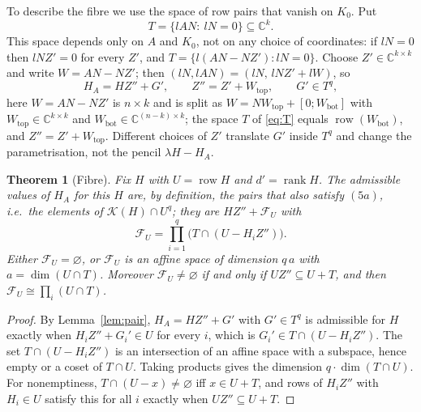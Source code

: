 \documentclass[journal]{IEEEtran}
\theoremstyle{plainn}
\newtheorem{thm}{Theorem}
\theoremstyle{remark}
\begin{document}
To describe the fibre we use the space of row pairs that vanish on $K_0$. Put
\begin{equation}\label{eq:T}
T=\{lAN:\ lN=0\}\subseteq\mathbb C^{k}.
\end{equation}
This space depends only on $A$ and $K_0$, not on any choice of coordinates: if $lN=0$ then
$lNZ'=0$ for every $Z'$, and $T=\{l(AN-NZ'):lN=0\}$. Choose $Z'\in\mathbb C^{k\times k}$ and write
$W=AN-NZ'$; then $(lN,lAN)=(lN,\,lNZ'+lW)$, so
\begin{equation}\label{eq:decomp}
H_A=HZ''+G',\qquad Z''=Z'+W_{\mathrm{top}},\qquad G'\in T^{q},
\end{equation}
here $W=AN-NZ'$ is $n\times k$ and is split as $W=NW_{\mathrm{top}}+[0;W_{\mathrm{bot}}]$ with
$W_{\mathrm{top}}\in\mathbb C^{k\times k}$ and $W_{\mathrm{bot}}\in\mathbb C^{(n-k)\times k}$; the space $T$ of
\eqref{eq:T} equals $\operatorname{row}(W_{\mathrm{bot}})$, and $Z''=Z'+W_{\mathrm{top}}$. Different choices
of $Z'$ translate $G'$ inside $T^{q}$ and change the parametrisation, not the pencil $\lambda H-H_A$.

\begin{thm}[Fibre]\label{thm:fibre}
Fix $H$ with $U=\operatorname{row}H$ and $d'=\operatorname{rank}H$. The admissible values of $H_A$ for this
$H$ are, by definition, the pairs that also satisfy $(5a)$, i.e.\ the elements of
$\mathcal K(H)\cap U^{q}$; they are $HZ''+\mathcal F_U$ with
\begin{equation}\label{eq:fibre}
\mathcal F_U=\prod_{i=1}^{q}\bigl(T\cap(U-H_iZ'')\bigr).
\end{equation}
Either $\mathcal F_U=\varnothing$, or $\mathcal F_U$ is an affine space of dimension $q\,a$ with
$a=\dim(U\cap T)$. Moreover $\mathcal F_U\ne\varnothing$ if and only if
$UZ''\subseteq U+T$, and then $\mathcal F_U\cong\prod_i (U\cap T)$.
\end{thm}

\begin{proof}
By Lemma~\ref{lem:pair}, $H_A=HZ''+G'$ with $G'\in T^{q}$ is admissible for $H$ exactly when
$H_iZ''+G_i'\in U$ for every $i$, which is $G_i'\in T\cap(U-H_iZ'')$. The set $T\cap(U-H_iZ'')$ is
an intersection of an affine space with a subspace, hence empty or a coset of $T\cap U$. Taking
products gives the dimension $q\cdot\dim(T\cap U)$. For nonemptiness, $T\cap(U-x)\ne\varnothing$ iff
$x\in U+T$, and rows of $H_iZ''$ with $H_i\in U$ satisfy this for all $i$ exactly when
$UZ''\subseteq U+T$.
\end{proof}
\end{document}
